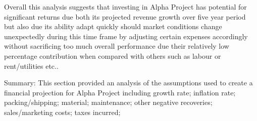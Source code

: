 Overall this analysis suggests that investing in Alpha Project has potential for significant returns due both its projected revenue growth over five year period but also due its ability adapt quickly should market conditions change unexpectedly during this time frame by adjusting certain expenses accordingly without sacrificing too much overall performance due their relatively low percentage contribution when compared with others such as labour or rent/utilities etc..  

Summary: This section provided an analysis of the assumptions used to create a financial projection for Alpha Project including growth rate; inflation rate; packing/shipping; material; maintenance; other negative recoveries; sales/marketing costs; taxes incurred;